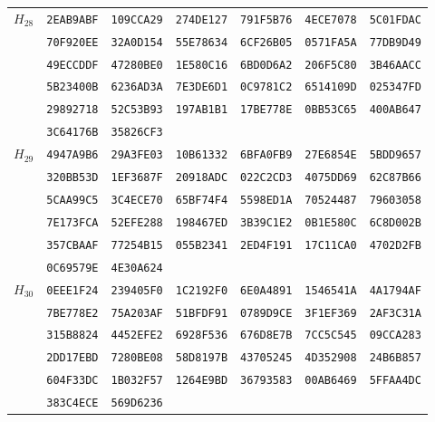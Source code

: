 \begin{table}
\begin{tabular}{@{}ccccccc@{}}
\midrule
\multirow{6}{*}{$H_{28}$}
 & \texttt{2EAB9ABF} & \texttt{109CCA29} & \texttt{274DE127} & \texttt{791F5B76} & \texttt{4ECE7078} & \texttt{5C01FDAC}\\
 & \texttt{70F920EE} & \texttt{32A0D154} & \texttt{55E78634} & \texttt{6CF26B05} & \texttt{0571FA5A} & \texttt{77DB9D49}\\
 & \texttt{49ECCDDF} & \texttt{47280BE0} & \texttt{1E580C16} & \texttt{6BD0D6A2} & \texttt{206F5C80} & \texttt{3B46AACC}\\
 & \texttt{5B23400B} & \texttt{6236AD3A} & \texttt{7E3DE6D1} & \texttt{0C9781C2} & \texttt{6514109D} & \texttt{025347FD}\\
 & \texttt{29892718} & \texttt{52C53B93} & \texttt{197AB1B1} & \texttt{17BE778E} & \texttt{0BB53C65} & \texttt{400AB647}\\
 & \texttt{3C64176B} & \texttt{35826CF3}\\

\midrule
\multirow{6}{*}{$H_{29}$}
 & \texttt{4947A9B6} & \texttt{29A3FE03} & \texttt{10B61332} & \texttt{6BFA0FB9} & \texttt{27E6854E} & \texttt{5BDD9657}\\
 & \texttt{320BB53D} & \texttt{1EF3687F} & \texttt{20918ADC} & \texttt{022C2CD3} & \texttt{4075DD69} & \texttt{62C87B66}\\
 & \texttt{5CAA99C5} & \texttt{3C4ECE70} & \texttt{65BF74F4} & \texttt{5598ED1A} & \texttt{70524487} & \texttt{79603058}\\
 & \texttt{7E173FCA} & \texttt{52EFE288} & \texttt{198467ED} & \texttt{3B39C1E2} & \texttt{0B1E580C} & \texttt{6C8D002B}\\
 & \texttt{357CBAAF} & \texttt{77254B15} & \texttt{055B2341} & \texttt{2ED4F191} & \texttt{17C11CA0} & \texttt{4702D2FB}\\
 & \texttt{0C69579E} & \texttt{4E30A624}\\

\midrule
\multirow{6}{*}{$H_{30}$}
 & \texttt{0EEE1F24} & \texttt{239405F0} & \texttt{1C2192F0} & \texttt{6E0A4891} & \texttt{1546541A} & \texttt{4A1794AF}\\
 & \texttt{7BE778E2} & \texttt{75A203AF} & \texttt{51BFDF91} & \texttt{0789D9CE} & \texttt{3F1EF369} & \texttt{2AF3C31A}\\
 & \texttt{315B8824} & \texttt{4452EFE2} & \texttt{6928F536} & \texttt{676D8E7B} & \texttt{7CC5C545} & \texttt{09CCA283}\\
 & \texttt{2DD17EBD} & \texttt{7280BE08} & \texttt{58D8197B} & \texttt{43705245} & \texttt{4D352908} & \texttt{24B6B857}\\
 & \texttt{604F33DC} & \texttt{1B032F57} & \texttt{1264E9BD} & \texttt{36793583} & \texttt{00AB6469} & \texttt{5FFAA4DC}\\
 & \texttt{383C4ECE} & \texttt{569D6236}\\


\end{tabular}
\end{table}
